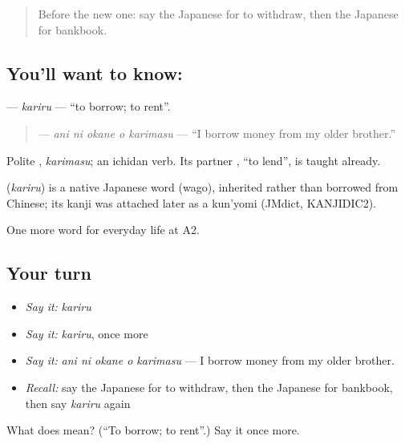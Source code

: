 \begin{quote}
Before the new one: say the Japanese for to withdraw, then the Japanese for bankbook.
\end{quote}

\subsection*{You'll want to know: }
\textbf{} — \emph{kariru} — \textquotedblleft{}to borrow; to rent\textquotedblright{}.

\begin{quote}
\textbf{  } — \emph{ani ni okane o karimasu} — \textquotedblleft{}I borrow money from my older brother.\textquotedblright{}
\end{quote}

Polite \textbf{}, \emph{karimasu}; an ichidan verb. Its partner \textbf{}, \textquotedblleft{}to lend\textquotedblright{}, is taught already.

\begin{cousinweb}
\textbf{} (\emph{kariru}) is a native Japanese word (wago), inherited rather than borrowed from Chinese; its kanji was attached later as a kun'yomi (JMdict, KANJIDIC2).
\end{cousinweb}

\begin{grammarlens}[title={What you've built}]
One more word for everyday life at A2.
\end{grammarlens}

\subsection*{Your turn}
\begin{itemize}
\raggedright
  \item \emph{Say it:} \emph{kariru}
  \item \emph{Say it:} \emph{kariru}, once more
  \item \emph{Say it:} \emph{ani ni okane o karimasu} — I borrow money from my older brother.
  \item \emph{Recall:} say the Japanese for to withdraw, then the Japanese for bankbook, then say \emph{kariru} again
\end{itemize}

\begin{tcolorbox}[breakable,colback=teal!4,colframe=teal!35!black,title={Before you move on}]
What does  mean? (\textquotedblleft{}To borrow; to rent\textquotedblright{}.) Say it once more.
\end{tcolorbox}
